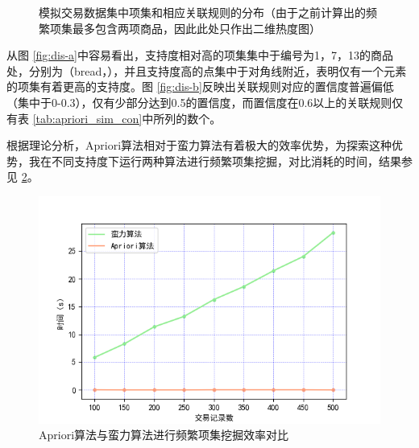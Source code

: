 \documentclass[12pt,a4paper]{article}
\theoremstyle{definition}
\begin{document}
\begin{figure}[H]
	\centering
	\caption{模拟交易数据集中项集和相应关联规则的分布（由于之前计算出的频繁项集最多包含两项商品，因此此处只作出二维热度图）}
	\label{fig:dis}
\end{figure}

从图 \ref{fig:dis-a}中容易看出，支持度相对高的项集集中于编号为1，7，13的商品处，分别为（bread，），并且支持度高的点集中于对角线附近，表明仅有一个元素的项集有着更高的支持度。图 \ref{fig:dis-b}反映出关联规则对应的置信度普遍偏低（集中于0-0.3），仅有少部分达到0.5的置信度，而置信度在0.6以上的关联规则仅有表 \ref{tab:apriori_sim_con}中所列的数个。

根据理论分析，Apriori算法相对于蛮力算法有着极大的效率优势，为探索这种优势，我在不同支持度下运行两种算法进行频繁项集挖掘，对比消耗的时间，结果参见 \ref{fig:time_com}。

\begin{figure}[H]
	\centering
	\includegraphics[width=0.7\linewidth]{img/time_kline.png}
	\caption{Apriori算法与蛮力算法进行频繁项集挖掘效率对比}
	\label{fig:time_com}
\end{figure}
\end{document}
